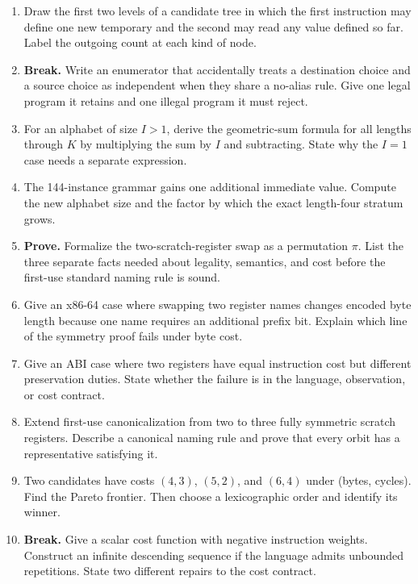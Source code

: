 \begin{enumerate}
\item Draw the first two levels of a candidate tree in which the first
instruction may define one new temporary and the second may read any value
defined so far. Label the outgoing count at each kind of node.

\item \textbf{Break.} Write an enumerator that accidentally treats a
destination choice and a source choice as independent when they share a
no-alias rule. Give one legal program it retains and one illegal program it
must reject.

\item For an alphabet of size \(I>1\), derive the geometric-sum formula for
all lengths through \(K\) by multiplying the sum by \(I\) and subtracting.
State why the \(I=1\) case needs a separate expression.

\item The 144-instance grammar gains one additional immediate value. Compute
the new alphabet size and the factor by which the exact length-four stratum
grows.

\item \textbf{Prove.} Formalize the two-scratch-register swap as a permutation
\(\pi\). List the three separate facts needed about legality, semantics, and
cost before the first-use standard naming rule is sound.

\item Give an x86-64 case where swapping two register names changes encoded
byte length because one name requires an additional prefix bit. Explain which
line of the symmetry proof fails under byte cost.

\item Give an ABI case where two registers have equal instruction cost but
different preservation duties. State whether the failure is in the language,
observation, or cost contract.

\item Extend first-use canonicalization from two to three fully symmetric
scratch registers. Describe a canonical naming rule and prove that every orbit
has a representative satisfying it.

\item Two candidates have costs \((4,3)\), \((5,2)\), and \((6,4)\) under
(bytes, cycles). Find the Pareto frontier. Then choose a lexicographic order
and identify its winner.

\item \textbf{Break.} Give a scalar cost function with negative instruction
weights. Construct an infinite descending sequence if the language admits
unbounded repetitions. State two different repairs to the cost contract.


\end{enumerate}
